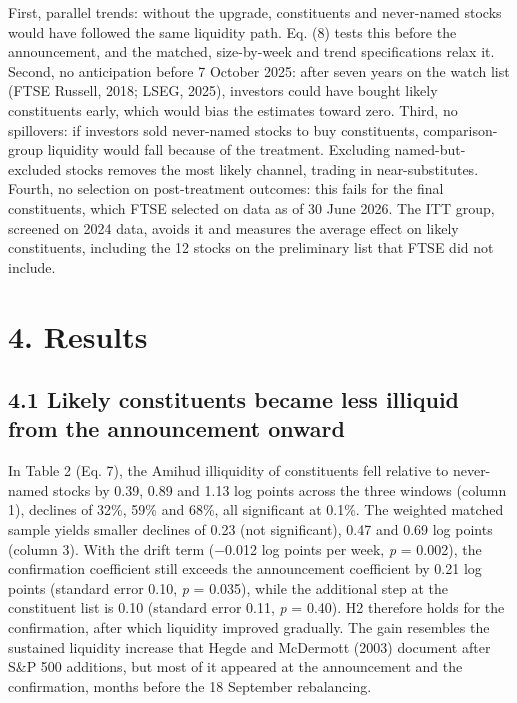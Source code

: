 First, parallel trends: without the upgrade, constituents and
never-named stocks would have followed the same liquidity path. Eq. (8)
tests this before the announcement, and the matched, size-by-week and
trend specifications relax it. Second, no anticipation before 7 October
2025: after seven years on the watch list (FTSE Russell, 2018; LSEG,
2025), investors could have bought likely constituents early, which
would bias the estimates toward zero. Third, no spillovers: if investors
sold never-named stocks to buy constituents, comparison-group liquidity
would fall because of the treatment. Excluding named-but-excluded stocks
removes the most likely channel, trading in near-substitutes. Fourth, no
selection on post-treatment outcomes: this fails for the final
constituents, which FTSE selected on data as of 30 June 2026. The ITT
group, screened on 2024 data, avoids it and measures the average effect
on likely constituents, including the 12 stocks on the preliminary list
that FTSE did not include.

\hypertarget{results}{%
\section{4. Results}\label{results}}

\hypertarget{likely-constituents-became-less-illiquid-from-the-announcement-onward}{%
\subsection{4.1 Likely constituents became less illiquid from the
announcement
onward}\label{likely-constituents-became-less-illiquid-from-the-announcement-onward}}

In Table 2 (Eq. 7), the Amihud illiquidity of constituents fell relative
to never-named stocks by 0.39, 0.89 and 1.13 log points across the three
windows (column 1), declines of 32\%, 59\% and 68\%, all significant at
0.1\%. The weighted matched sample yields smaller declines of 0.23 (not
significant), 0.47 and 0.69 log points (column 3). With the drift term
(−0.012 log points per week, \emph{p} = 0.002), the confirmation
coefficient still exceeds the announcement coefficient by 0.21 log
points (standard error 0.10, \emph{p} = 0.035), while the additional
step at the constituent list is 0.10 (standard error 0.11, \emph{p} =
0.40). H2 therefore holds for the confirmation, after which liquidity
improved gradually. The gain resembles the sustained liquidity increase
that Hegde and McDermott (2003) document after S\&P 500 additions, but
most of it appeared at the announcement and the confirmation, months
before the 18 September rebalancing.

